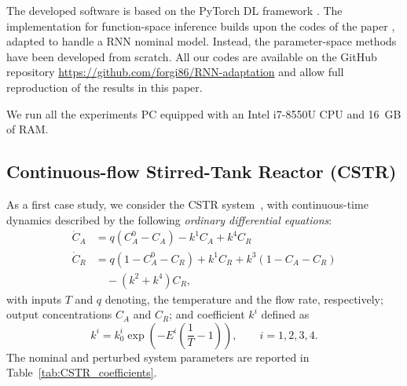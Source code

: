 \documentclass{article}
\begin{document}
The developed software is based on the PyTorch DL framework \cite{paszke2017automatic}. 
The implementation for function-space inference builds upon the codes of the paper \cite{maddox2021fast}, 
adapted to handle a RNN nominal model. Instead, the parameter-space methods have been developed 
from scratch. All our codes are available on the GitHub repository \url{https://github.com/forgi86/RNN-adaptation} and allow full reproduction of the results in this paper.

We run all the experiments PC equipped with an Intel i7-8550U CPU and 16~GB of RAM.  


\subsection{Continuous-flow Stirred-Tank Reactor (CSTR)}
As a first case study, we consider the CSTR system~\cite{CSTR_textbook}, with continuous-time dynamics described by the following \emph{ordinary differential equations}:
\begin{align}
\dot C_A &= 
q (C_{A}^0 - C_A) - k^1 C_A + k^4 C_R \nonumber \\
\dot C_R &= q(1 - C_{A}^0 - C_R) \!+\! k^1 C_R \!+\! k^3 (1 - C_A - C_R) \nonumber \\ & \quad \!-\! (k^2 + k^4) C_R, \label{eqn:CSTR}
\end{align}
with inputs  $T$ and  $q$ denoting,  the temperature and the flow rate, respectively;  output concentrations $C_A$ and $C_R$;  and coefficient   $k^i$ defined as  
\begin{equation}
    k^i = k_{0}^{i} \exp\left(-E^i \left(\frac{1}{T} - 1\right)\right), \qquad i=1,2,3,4.
\end{equation}
The nominal and perturbed system parameters are reported in Table~\ref{tab:CSTR_coefficients}.
\end{document}
